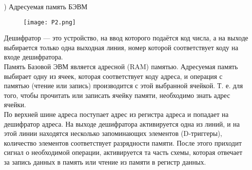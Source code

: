 ) Адресуемая память БЭВМ \\
\begin{figure}[H]
    \centering
    \texttt{[image: P2.png]}
\end{figure}
\noindent Дешифратор — это устройство, на ввод которого подаётся код числа, а на выходе выбирается только одна выходная линия, номер которой соответствует коду на входе дешифратора. \\
Память Базовой ЭВМ является адресной (RAM) памятью. Адресуемая память выбирает одну из ячеек, которая соответствует коду адреса, и операция с памятью (чтение или запись) производится с этой выбранной ячейкой. Т. е. для того, чтобы прочитать или записать ячейку памяти, необходимо знать адрес ячейки. \\
По верхней шине адреса поступает адрес из регистра адреса и попадает на дешифратор адреса. На выходе дешифратора активируется одна из линий, и на этой линии находятся несколько запоминающих элементов (D-триггеры), количество элементов соответствует разрядности памяти. После этого приходит сигнал о необходимой операции, активируется та часть схемы, которая отвечает за запись данных в память или чтение из памяти в регистр данных. \\

